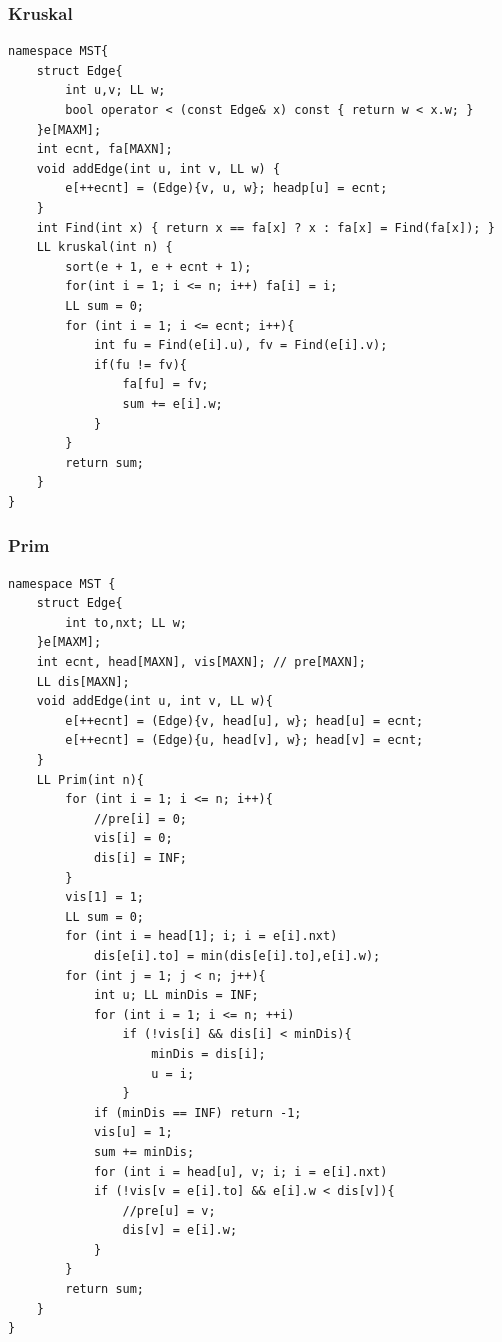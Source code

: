 \documentclass[10pt]{ctexart}
\begin{document}
{\subsubsection{Kruskal}
\begin{lstlisting}
namespace MST{
    struct Edge{
        int u,v; LL w;
        bool operator < (const Edge& x) const { return w < x.w; }
    }e[MAXM];
    int ecnt, fa[MAXN];
    void addEdge(int u, int v, LL w) {
        e[++ecnt] = (Edge){v, u, w}; headp[u] = ecnt;
    }
    int Find(int x) { return x == fa[x] ? x : fa[x] = Find(fa[x]); }
    LL kruskal(int n) {
        sort(e + 1, e + ecnt + 1);
        for(int i = 1; i <= n; i++) fa[i] = i;
        LL sum = 0;
        for (int i = 1; i <= ecnt; i++){
            int fu = Find(e[i].u), fv = Find(e[i].v);
            if(fu != fv){
                fa[fu] = fv;
                sum += e[i].w;
            }
        }
        return sum;
    }
}
\end{lstlisting}
\subsubsection{Prim}
\begin{lstlisting}
namespace MST {
    struct Edge{
        int to,nxt; LL w;
    }e[MAXM];
    int ecnt, head[MAXN], vis[MAXN]; // pre[MAXN];
    LL dis[MAXN];
    void addEdge(int u, int v, LL w){
        e[++ecnt] = (Edge){v, head[u], w}; head[u] = ecnt;
        e[++ecnt] = (Edge){u, head[v], w}; head[v] = ecnt;
    }
    LL Prim(int n){
        for (int i = 1; i <= n; i++){
            //pre[i] = 0;
            vis[i] = 0;
            dis[i] = INF;
        }
        vis[1] = 1;
        LL sum = 0;
        for (int i = head[1]; i; i = e[i].nxt)
            dis[e[i].to] = min(dis[e[i].to],e[i].w);
        for (int j = 1; j < n; j++){
            int u; LL minDis = INF;
            for (int i = 1; i <= n; ++i)
                if (!vis[i] && dis[i] < minDis){
                    minDis = dis[i];
                    u = i;
                }
            if (minDis == INF) return -1;
            vis[u] = 1;
            sum += minDis;
            for (int i = head[u], v; i; i = e[i].nxt)
            if (!vis[v = e[i].to] && e[i].w < dis[v]){
                //pre[u] = v;
                dis[v] = e[i].w;
            }
        }
        return sum;
    }
}
\end{lstlisting}
}
\end{document}
